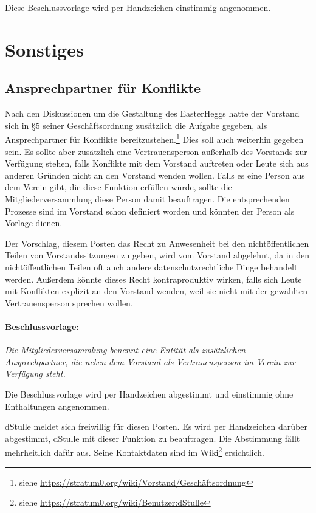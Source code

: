 \documentclass[a4paper,12pt]{scrartcl}
\begin{document}
Diese Beschlussvorlage wird per Handzeichen einstimmig angenommen.

\section{Sonstiges}

\subsection{Ansprechpartner für Konflikte} Nach den Diskussionen um die
Gestaltung des EasterHeggs hatte der Vorstand sich in §5 seiner Geschäftsordnung
zusätzlich die Aufgabe gegeben, als Ansprechpartner für Konflikte
bereitzustehen.\footnote{siehe
\url{https://stratum0.org/wiki/Vorstand/Geschäftsordnung}} Dies soll auch
weiterhin gegeben sein. Es sollte aber zusätzlich eine Vertrauensperson außerhalb
des Vorstands zur Verfügung stehen, falls Konflikte mit dem Vorstand auftreten
oder Leute sich aus anderen Gründen nicht an den Vorstand wenden wollen. Falls
es eine Person aus dem Verein gibt, die diese Funktion erfüllen würde, sollte
die Mitgliederversammlung diese Person damit beauftragen. Die entsprechenden
Prozesse sind im Vorstand schon definiert worden und könnten der Person als
Vorlage dienen.

Der Vorschlag, diesem Posten das Recht zu Anwesenheit bei
den nichtöffentlichen Teilen von Vorstandssitzungen zu geben, wird vom Vorstand
abgelehnt, da in den nichtöffentlichen Teilen oft auch andere
datenschutzrechtliche Dinge behandelt werden. Außerdem könnte dieses Recht
kontraproduktiv wirken, falls sich Leute mit Konflikten explizit an den Vorstand
wenden, weil sie nicht mit der gewählten Vertrauensperson sprechen wollen.

\paragraph{Beschlussvorlage:} \emph{Die Mitgliederversammlung benennt eine Entität als
zusätzlichen Ansprechpartner, die neben dem Vorstand als Vertrauensperson im
Verein zur Verfügung steht.}

Die Beschlussvorlage wird per Handzeichen abgestimmt und einstimmig ohne
Enthaltungen angenommen.

dStulle meldet sich freiwillig für diesen Posten. Es wird per Handzeichen
darüber abgestimmt, dStulle mit dieser Funktion zu beauftragen. Die Abstimmung
fällt mehrheitlich dafür aus. Seine Kontaktdaten sind im Wiki\footnote{siehe
\url{https://stratum0.org/wiki/Benutzer:dStulle}} ersichtlich.
\end{document}
